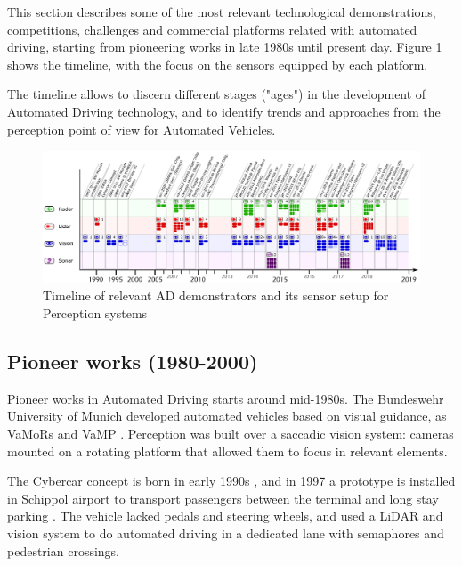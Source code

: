 This section describes some of the most relevant technological demonstrations, competitions, challenges and commercial platforms related with automated driving, starting from pioneering works in late 1980s until present day. Figure \ref{fig:tech-demos} shows the timeline, with the focus on the sensors equipped by each platform.

The timeline allows to discern different stages ("ages") in the development of Automated Driving technology, and to identify trends and approaches from the perception point of view for Automated Vehicles.

\begin{figure}[p] %
  \includegraphics[width=0.95\textheight,angle=90,keepaspectratio]{"img/AD_demos_Timeline"}
  \caption{Timeline of relevant AD demonstrators and its sensor setup for 
      Perception systems}
  \label{fig:tech-demos}
\end{figure}

\subsection{Pioneer works (1980-2000)}

Pioneer works in Automated Driving starts around mid-1980s. The Bundeswehr 
University of Munich developed automated vehicles based on visual guidance, as 
VaMoRs \cite{Dickmanns1987} and VaMP \cite{Gregor2002}. 
Perception was built over a saccadic vision system: cameras mounted on a
rotating platform that allowed them to focus in relevant elements. 

The Cybercar concept is born in early 1990s \cite{Parent1993}, and in 1997
a prototype is installed in Schippol airport to transport passengers between
the terminal and long stay parking \cite{Ozguner2007}. 
The vehicle lacked pedals and steering wheels, and used a LiDAR and vision
system to do automated driving in a dedicated lane with semaphores and
pedestrian crossings.

